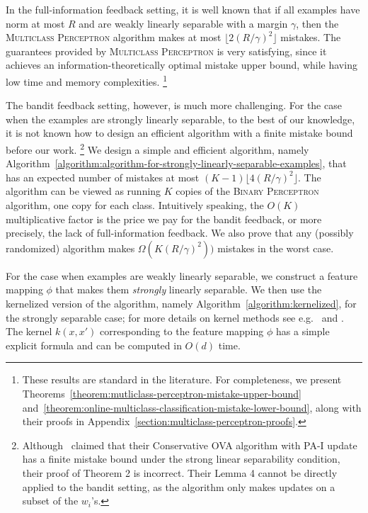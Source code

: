 In the full-information feedback setting, it is well known that if all examples
have norm at most $R$ and are weakly linearly separable with a margin $\gamma$,
then the \textsc{Multiclass Perceptron} algorithm makes at most $\lfloor
2(R/\gamma)^2 \rfloor$ mistakes. The guarantees provided by \textsc{Multiclass
Perceptron} is very satisfying, since it achieves an information-theoretically
optimal mistake upper bound, while having low time and memory complexities.
\footnote{These results are standard in the literature. For completeness, we
present Theorems~\ref{theorem:mutliclass-perceptron-mistake-upper-bound}
and~\ref{theorem:online-multiclass-classification-mistake-lower-bound}, along
with their proofs in Appendix~\ref{section:multiclass-perceptron-proofs}.}

The bandit feedback setting, however, is much more challenging. For the case
when the examples are strongly linearly separable, to the best of our knowledge,
it is not known how to design an efficient algorithm with a finite mistake bound
before our work. \footnote{Although~\cite{Chen-Chen-Zhang-Chen-Zhang-2009}
claimed that their Conservative OVA algorithm with PA-I update has a finite
mistake bound under the strong linear separability condition, their proof of
Theorem 2 is incorrect. Their Lemma 4 cannot be directly applied to the bandit
setting, as the algorithm only makes updates on a subset of the $w_i$'s.} We
design a simple and efficient algorithm, namely
Algorithm~\ref{algorithm:algorithm-for-strongly-linearly-separable-examples},
that has an expected number of mistakes at most $(K-1) \lfloor 4(R/\gamma)^2
\rfloor$. The algorithm can be viewed as running $K$ copies of the
\textsc{Binary Perceptron} algorithm, one copy for each class. Intuitively
speaking, the $O(K)$ multiplicative factor is the price we pay for the bandit
feedback, or more precisely, the lack of full-information feedback. We also
prove that any (possibly randomized) algorithm makes $\Omega(K (R/\gamma)^2))$
mistakes in the worst case.

For the case when examples are weakly linearly separable, we construct a feature
mapping $\phi$ that makes them \emph{strongly} linearly separable. We then use
the kernelized version of the algorithm, namely
Algorithm~\ref{algorithm:kernelized}, for the strongly separable case; for more
details on kernel methods see e.g.~\citet{Scholkopf-Smola-2002} and
\citet{Shawe-Taylor-Cristianini-2004}. The kernel $k(x,x')$ corresponding to the
feature mapping $\phi$ has a simple explicit formula and can be computed in
$O(d)$ time.

